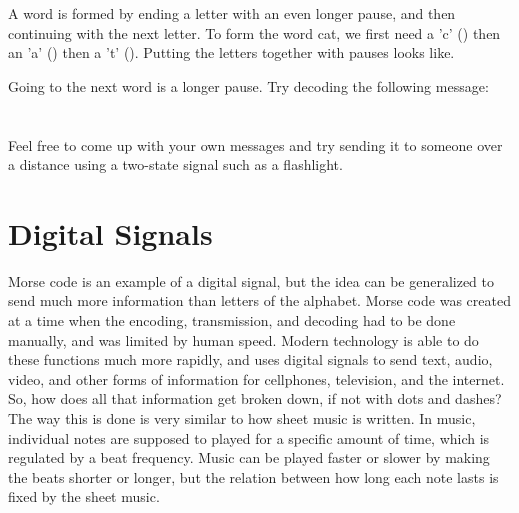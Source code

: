 \begin{center}\end{center}

A word is formed by ending a letter with an even longer pause, and then continuing with the next letter. To form the word cat, we first need a 'c' (\mdah\mdit\mdah\mdit) then an 'a' (\mdit\mdah) then a 't' (\mdah). Putting the letters together with pauses looks like.

\begin{center}
	\mdah\mdit\mdah\mdit\mlet\mdit\mdah\mlet\mdah
\end{center}

Going to the next word is a longer pause. Try decoding the following message: \mdit\mdit\mlet\mdah\mdit\mword
\mdah\mlet\mdit\mlet\mdit\mdah\mlet\mdah\mdit\mdah\mdit\mlet\mdit\mdit\mdit\mdit\mlet\mdit\mdit\mlet\mdah\mdit\mlet\mdah\mdah\mdit\mword \\
\mdah\mdah\mdah\mlet\mdah\mlet\mdit\mdit\mdit\mdit\mlet\mdit\mlet\mdit\mdah\mdit\mlet\mdit\mdit\mdit\mword
\mdit\mdah\mdah\mlet\mdit\mword
\mdah\mlet\mdit\mlet\mdit\mdah\mlet\mdah\mdit\mdah\mdit\mlet\mdit\mdit\mdit\mdit\mword\\
\mdah\mdah\mdah\mlet\mdit\mdit\mdah\mlet\mdit\mdah\mdit\mlet\mdit\mdit\mdit\mlet\mdit\mlet\mdit\mdah\mdit\mdit\mlet\mdit\mdit\mdit\mdah\mlet\mdit\mlet\mdit\mdit\mdit\\

Feel free to come up with your own messages and try sending it to someone over a distance using a two-state signal such as a flashlight.

\section{Digital Signals}

Morse code is an example of a digital signal, but the idea can be generalized to send much more information than letters of the alphabet. Morse code was created at a time when the encoding, transmission, and decoding had to be done manually, and was limited by human speed. Modern technology is able to do these functions much more rapidly, and uses digital signals to send text, audio, video, and other forms of information for cellphones, television, and the internet. So, how does all that information get broken down, if not with dots and dashes?\\

The way this is done is very similar to how sheet music is written. In music, individual notes are supposed to played for a specific amount of time, which is regulated by a beat frequency. Music can be played faster or slower by making the beats shorter or longer, but the relation between how long each note lasts is fixed by the sheet music.\\

